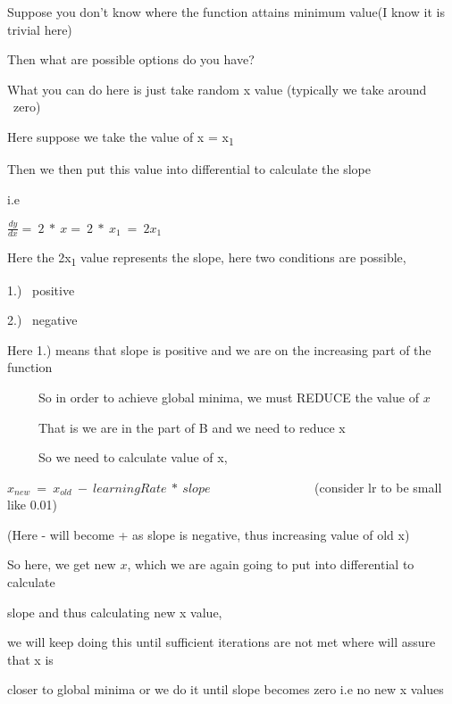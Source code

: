 Suppose you don't know where the function attains minimum value(I know it is trivial here) 

Then what are possible options do you have?

 

What you can do here is just take random x value (typically we take around \ zero)



Here suppose we take the value of x = x\textsubscript{1}



Then we then put this value into differential to calculate the slope 

i.e 

		$\displaystyle \frac{dy}{dx} =\ 2\ *\ x =\ 2\ *\ x_{1} \ =\ 2x_{1}$



Here the 2x\textsubscript{1} value represents the slope, here two conditions are possible,



1.) \ positive 

2.) \ negative 



Here 1.) means that slope is positive and we are on the increasing part of the function

	 \ \ \ \ \ So in order to achieve global minima, we must REDUCE the value of $\displaystyle x$ 

	 \ \ \ \ \ That is we are in the part of B and we need to reduce x

	 \ \ \ \ \ So we need to calculate value of x,



		$\displaystyle x_{new} \ =\ x_{old} \ -\ learningRate\ *\ slope$ \ \ \ \ \ \ \ \ \ \ \ \ \ \ \ \ (consider lr to be small like 0.01)

		(Here - will become + as slope is negative, thus increasing value of old x)		



		So here, we get new $\displaystyle x$, which we are again going to put into differential to calculate 

		slope and thus calculating new x value,

		we will keep doing this until sufficient iterations are not met where will assure that x is 

		closer to global minima or we do it until slope becomes zero i.e no new x values





